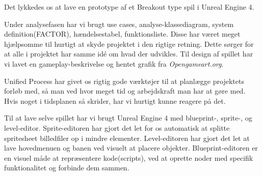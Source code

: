 
Det lykkedes os at lave en prototype af et Breakout type spil i Unreal Engine 4.

Under analysefasen har vi brugt use cases, analyse-klassediagram, system definition(FACTOR), hændelsestabel, funktionsliste. Disse har været meget hjælpsomme til hurtigt at skyde projektet i den rigtige retning. Dette sørger for at alle i projektet har samme idé om hvad der udvikles.
Til design af spillet har vi lavet en gameplay-beskrivelse og hentet grafik fra \textit{Opengameart.org}.

Unified Process har givet os rigtig gode værktøjer til at planlægge projektets forløb med, så man ved hvor meget tid og arbejdskraft man har at gøre med. Hvis noget i tidsplanen så skrider, har vi hurtigt kunne reagere på det.

Til at lave selve spillet har vi brugt Unreal Engine 4 med blueprint-, sprite-, og level-editor. Sprite-editoren har gjort det let for os automatisk at splitte spritesheet billedfiler op i mindre elementer. Level-editoren har gjort det let at lave hovedmenuen og banen ved visuelt at placere objekter. Blueprint-editoren er en visuel måde at repræsentere kode(scripts), ved at oprette noder med specifik funktionalitet og forbinde dem sammen.